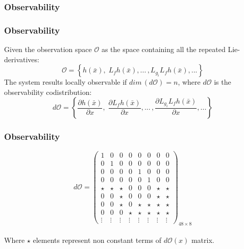 \subsubsection{Observability}
\begin{frame}
\frametitle{Observability}
Given the observation space $\mathcal{O}$ as the space containing all the repeated Lie-derivatives:
\[
\mathcal{O} = \left\{h(\bar{x}),\;L_fh(\bar{x}),...\,,L_{g_i}L_fh(\bar{x}),...\right\}
\]
The system results locally observable if $dim\,(d\mathcal{O}) = n$, where $d\mathcal{O}$ is the observability codistribution:
\[
d\mathcal{O} = \left\{\frac{\partial h(\bar{x})}{\partial x},\;\frac{\partial L_fh(\bar{x})}{\partial x},...\,,\frac{\partial L_{g_i}L_fh(\bar{x})}{\partial x},...\right\}
\]
\end{frame}
%
%
\begin{frame}
\frametitle{Observability}
\begin{equation*}
	d\mathcal{O} =%
	\begin{pmatrix}
		1 &0 &0 &0 &0 &0 &0 &0 \\
		0 &1 &0 &0 &0 &0 &0 &0 \\
		0 &0 &0 &0 &1 &0 &0 &0 \\
		0 &0 &0 &0 &0 &1 &0 &0 \\
	    \star &\star &\star &0 &0 &0 &\star &\star \\
		0 &0 &\star &0 &0 &0 &\star &\star \\
		0 &0 &\star &0 &\star &\star &\star &\star \\
		0 &0 &0 &\star &\star &\star &\star &\star \\
		\vdots &\vdots &\vdots &\vdots &\vdots &\vdots &\vdots &\vdots
	\end{pmatrix}_{48\times8}
\end{equation*}\\[8pt]
Where $\star$ elements represent non constant terms of $d\mathcal{O}(x)$ matrix.
\end{frame}
